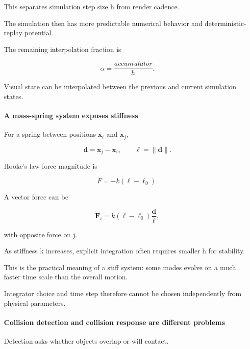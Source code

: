 This separates simulation step size h from render cadence.

The simulation then has more predictable numerical behavior and deterministic-replay potential.

The remaining interpolation fraction is

\[
\alpha=
\frac{accumulator}{h}.
\]

Visual state can be interpolated between the previous and current simulation states.

\paragraph{A mass-spring system exposes stiffness}\label{03-visual-computing-i-ch001-a-mass-spring-system-exposes-stiffness}

\hypertarget{03-visual-computing-i-ch001-a-mass-spring-system-exposes-stiffness}{}

For a spring between positions \(\mathbf x_i\) and \(\mathbf x_j\),

\[
\mathbf d=\mathbf x_j-\mathbf x_i,
\qquad
\ell=\|\mathbf d\|.
\]

Hooke's law force magnitude is

\[
F=-k(\ell-\ell_0).
\]

A vector force can be

\[
\mathbf F_i
=
k(\ell-\ell_0)
\frac{\mathbf d}{\ell},
\]

with opposite force on j.

As stiffness k increases, explicit integration often requires smaller h for stability.

This is the practical meaning of a stiff system: some modes evolve on a much faster time scale than the overall motion.

Integrator choice and time step therefore cannot be chosen independently from physical parameters.

\paragraph{Collision detection and collision response are different problems}\label{03-visual-computing-i-ch001-collision-detection-and-collision-response-are-different-problems}

\hypertarget{03-visual-computing-i-ch001-collision-detection-and-collision-response-are-different-problems}{}

Detection asks whether objects overlap or will contact.

